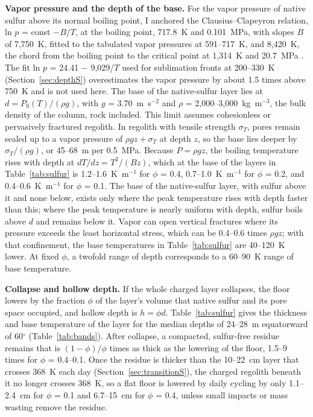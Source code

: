 \documentclass{planetary}
\begin{document}
\textbf{Vapor pressure and the depth of the base.} For the vapor pressure of native sulfur above its normal boiling point, I anchored the Clausius--Clapeyron relation, ln $p$ = const $- B/T$, at the boiling point, 717.8~K and 0.101~MPa, with slopes $B$ of 7,750~K, fitted to the tabulated vapor pressures at 591--717~K, and 8,420~K, the chord from the boiling point to the critical point at 1,314~K and 20.7~MPa \parencite{lide2007}. The fit ln $p$ = 24.41 $-$ 9,029/$T$ used for sublimation fronts at 200--330~K (Section~\ref{sec:depthS}) overestimates the vapor pressure by about 1.5 times above 750~K and is not used here. The base of the native-sulfur layer lies at $d = P_{\mathrm{S}}(T)/(\rho g)$, with $g$ = 3.70~m~s$^{-2}$ and $\rho$ = 2,000--3,000~kg~m$^{-3}$, the bulk density of the column, rock included. This limit assumes cohesionless or pervasively fractured regolith. In regolith with tensile strength $\sigma_T$, pores remain sealed up to a vapor pressure of $\rho g z + \sigma_T$ at depth $z$, so the base lies deeper by $\sigma_T/(\rho g)$, or 45--68~m per 0.5~MPa. Because $P = \rho g z$, the boiling temperature rises with depth at $dT/dz = T^2/(B z)$, which at the base of the layers in Table~\ref{tab:sulfur} is 1.2--1.6~K~m$^{-1}$ for $\phi$ = 0.4, 0.7--1.0~K~m$^{-1}$ for $\phi$ = 0.2, and 0.4--0.6~K~m$^{-1}$ for $\phi$ = 0.1. The base of the native-sulfur layer, with sulfur above it and none below, exists only where the peak temperature rises with depth faster than this; where the peak temperature is nearly uniform with depth, sulfur boils above $d$ and remains below it. Vapor can open vertical fractures where its pressure exceeds the least horizontal stress, which can be 0.4--0.6 times $\rho g z$; with that confinement, the base temperatures in Table~\ref{tab:sulfur} are 40--120~K lower. At fixed $\phi$, a twofold range of depth corresponds to a 60--90~K range of base temperature.

\textbf{Collapse and hollow depth.} If the whole charged layer collapses, the floor lowers by the fraction $\phi$ of the layer's volume that native sulfur and its pore space occupied, and hollow depth is $h = \phi d$. Table~\ref{tab:sulfur} gives the thickness and base temperature of the layer for the median depths of 24--28~m equatorward of 60$^\circ$ (Table~\ref{tab:bands}). After collapse, a compacted, sulfur-free residue remains that is $(1-\phi)/\phi$ times as thick as the lowering of the floor, 1.5--9 times for $\phi$ = 0.4--0.1. Once the residue is thicker than the 10--22~cm layer that crosses 368~K each day (Section~\ref{sec:transitionS}), the charged regolith beneath it no longer crosses 368~K, so a flat floor is lowered by daily cycling by only 1.1--2.4~cm for $\phi$ = 0.1 and 6.7--15~cm for $\phi$ = 0.4, unless small impacts or mass wasting remove the residue.
\end{document}
